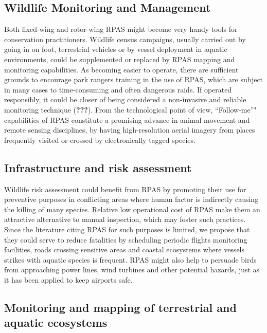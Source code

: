 \documentclass[]{interact}
\theoremstyle{plain}%
\theoremstyle{definition}
\theoremstyle{remark}
\begin{document}
\subsection{Wildlife Monitoring and
Management}\label{wildlife-monitoring-and-management-1}

Both fixed-wing and rotor-wing RPAS might become very handy tools for
conservation practitioners. Wildlife census campaigns, usually carried
out by going in on foot, terrestrial vehicles or by vessel deployment in
aquatic environments, could be supplemented or replaced by RPAS mapping
and monitoring capabilities. As becoming easier to operate, there are
sufficient grounds to encourage park rangers training in the use of
RPAS, which are subject in many cases to time-consuming and often
dangerous raids. If operated responsibly, it could be closer of being
considered a non-invasive and reliable monitoring technique
({\textbf{???}}). From the technological point of view, ``Follow-me''"
capabilities of RPAS constitute a promising advance in animal movement
and remote sensing disciplines, by having high-resolution aerial imagery
from places frequently visited or crossed by electronically tagged
species.

\subsection{Infrastructure and risk
assessment}\label{infrastructure-and-risk-assessment-1}

Wildlife risk assessment could benefit from RPAS by promoting their use
for preventive purposes in conflicting areas where human factor is
indirectly causing the killing of many species. Relative low operational
cost of RPAS make them an attractive alternative to manual inspection,
which may foster such practices. Since the literature citing RPAS for
such purposes is limited, we propose that they could serve to reduce
fatalities by scheduling periodic flights monitoring facilities, roads
crossing sensitive areas and coastal ecosystems where vessels strikes
with aquatic species is frequent. RPAS might also help to persuade birds
from approaching power lines, wind turbines and other potential hazards,
just as it has been applied to keep airports safe.

\subsection{Monitoring and mapping of terrestrial and aquatic
ecosystems}\label{monitoring-and-mapping-of-terrestrial-and-aquatic-ecosystems-1}
\end{document}
